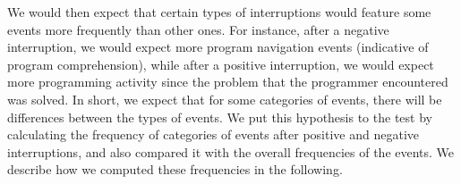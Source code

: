 \documentclass[times]{smrauth}
\begin{document}
We would then expect that certain types of interruptions would feature some events more frequently than other ones. For instance, after a negative interruption, we would expect more program navigation events (indicative of program comprehension), while after a positive interruption, we would expect more programming activity since the problem that the programmer encountered was solved. In short, we expect that for some categories of events, there will be differences between the types of events. We put this hypothesis to the test by calculating the frequency of categories of events after positive and negative interruptions, and also compared it with the overall frequencies of the events. We describe how we computed these frequencies in the following.


\end{document}
